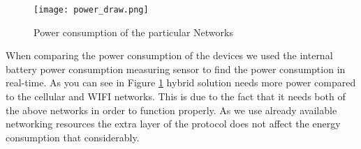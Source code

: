 \begin{figure}[H]
    \centering
    \texttt{[image: power\_draw.png]}
    \caption{Power consumption of the particular Networks  }
    \label{fig:pca_coeff_ggjjgg_gjgjgj_jjggjz}
\end{figure}
\vspace{12pt}

When comparing the power consumption of the devices we used the internal battery power consumption measuring sensor to find the power consumption in real-time. As you can see in  Figure \ref{fig:pca_coeff_ggjjgg_gjgjgj_jjggjz} hybrid solution needs more power compared to the cellular and WIFI networks. This is due to the fact that it needs both of the above networks in order to function properly. As we use already available networking resources the extra layer of the protocol does not affect the energy consumption that considerably.










